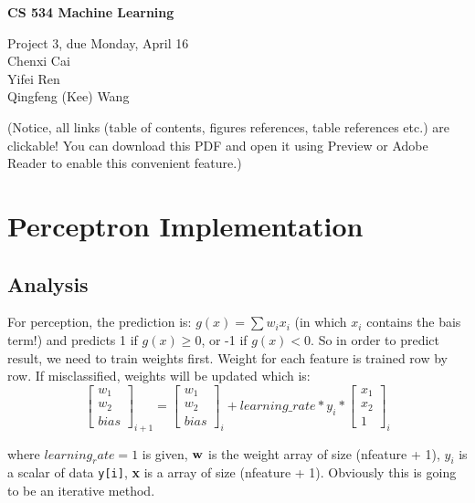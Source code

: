 \documentclass[11pt]{article}
\begin{document}
\begin{center}
  {\bf
  CS 534 Machine Learning  }

\vspace{12pt}

  Project 3, due Monday, April 16
  \\
  Chenxi Cai \\
  Yifei Ren \\
  Qingfeng (Kee) Wang
 
\end{center}

\vspace{12pt}




\clearpage
(Notice, all links (table of contents, figures references, table references etc.) are clickable! You can download this PDF and open it using Preview or Adobe Reader to enable this convenient feature.)
 
\tableofcontents{}

\clearpage
\section{Perceptron Implementation}

\subsection{Analysis}
For perception, the prediction is: $g(x) = \sum w_ix_i$ (in which $x_i$ contains the bais term!) and predicts 1 if $g(x) \ge 0$, or -1 if $g(x) < 0$. So in order to predict result, we need to train weights first. Weight for each feature is trained row by row. If misclassified, weights will be updated which is: 
\[
\begin{bmatrix}
w_1 \\
w_2 \\
bias  
\end{bmatrix}_{i+1}
=
\begin{bmatrix}
w_1 \\
w_2 \\
bias  
\end{bmatrix}_{i}
+  learning\_rate * y_i * 
\begin{bmatrix}
x_1 \\
x_2 \\
1  
\end{bmatrix}_i
\]


where $learning_rate = 1$ is given, $\bf{w}$ is the weight array of size (nfeature + 1), $y_i$ is a scalar of data {\tt y[i]}, {\bf x} is a array of size (nfeature + 1). Obviously this is going to be an iterative method. 
\end{document}
